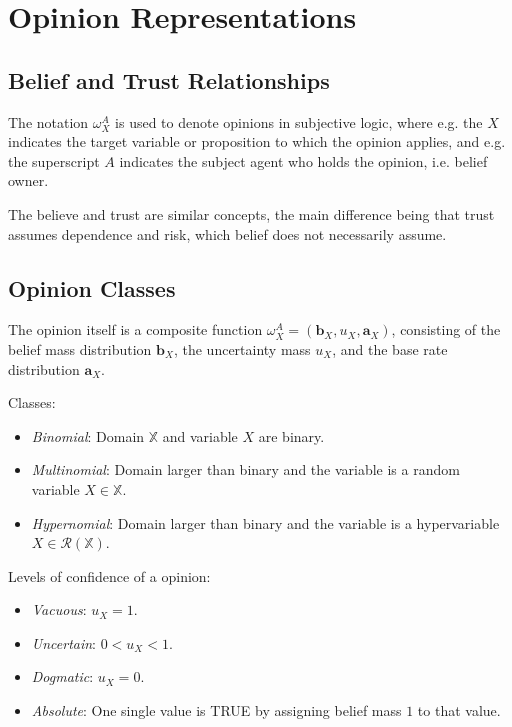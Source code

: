
\section{Opinion Representations}

\subsection{Belief and Trust Relationships}

The notation $\omega_X^A$ is used to denote opinions in subjective logic, where e.g. the $X$ indicates the target variable or proposition to which the opinion applies, and e.g. the superscript $A$ indicates the subject agent who holds the opinion, i.e. belief owner.

The believe and trust are similar concepts, the main difference being that trust assumes dependence and risk, which belief does not necessarily assume.

\subsection{Opinion Classes}

The opinion itself is a composite function $\omega^A_ X = \left(\mathbf{b}_X, u_X, \mathbf{a}_X\right)$, consisting of the belief mass distribution $\mathbf{b}_X$, the uncertainty mass $u_X$, and the base rate distribution $\mathbf{a}_X$.

Classes:
\begin{itemize}
	\item \emph{Binomial}: Domain $\mathbb{X}$ and variable $X$ are binary.
	\item \emph{Multinomial}: Domain larger than binary and the variable is a random variable $X \in \mathbb{X}$.
	\item \emph{Hypernomial}: Domain larger than binary and the variable is a hypervariable $X \in \mathcal{R}(\mathbb{X})$.
\end{itemize}

Levels of confidence of a opinion:
\begin{itemize}
	\item \emph{Vacuous}: $u_X = 1$.
	\item \emph{Uncertain}: $0 < u_X < 1$.
	\item \emph{Dogmatic}: $u_X = 0$.
	\item \emph{Absolute}: One single value is TRUE by assigning belief mass $1$ to that value.
\end{itemize}

